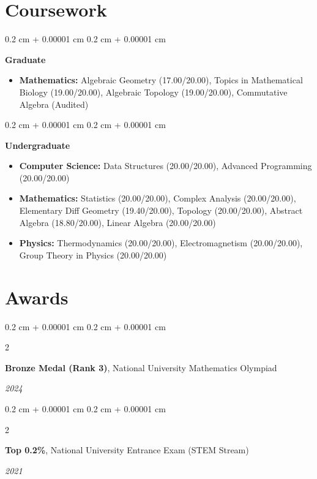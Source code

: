 \documentclass[10pt, letterpaper]{article}
\newenvironment{highlightsforbulletentries}{
    \begin{itemize}[
        topsep=0.05 cm,
        parsep=0.04 cm,
        partopsep=0pt,
        itemsep=0pt,
        leftmargin=10pt
    ]
}{
    \end{itemize}
} %
\newenvironment{onecolentry}{
    \begin{adjustwidth}{
        0.2 cm + 0.00001 cm
    }{
        0.2 cm + 0.00001 cm
    }
}{
    \end{adjustwidth}
} %
\newenvironment{twocolentry}[2][]{
    \onecolentry
    \def\secondColumn{#2}
    \setcolumnwidth{\fill, 4.5 cm}
    \begin{paracol}{2}
}{
    \switchcolumn \raggedleft \secondColumn
    \end{paracol}
    \endonecolentry
} %
\begin{document}
    \section{Coursework}        
        \begin{onecolentry}
            \textbf{Graduate}

		\begin{highlightsforbulletentries} 
        \item \textbf{Mathematics:} Algebraic Geometry (17.00/20.00), Topics in Mathematical Biology (19.00/20.00), Algebraic Topology (19.00/20.00), Commutative Algebra (Audited)
        \end{highlightsforbulletentries}  
        \end{onecolentry}    
        
        \vspace{0.2 cm}

        \begin{onecolentry}
            \textbf{Undergraduate}
		\begin{highlightsforbulletentries}
		\item \textbf{Computer Science:} Data Structures (20.00/20.00), Advanced Programming (20.00/20.00)
		 \item \textbf{Mathematics:} Statistics (20.00/20.00), Complex Analysis (20.00/20.00), Elementary Diff Geometry (19.40/20.00), Topology (20.00/20.00), Abstract Algebra (18.80/20.00), Linear Algebra (20.00/20.00)
		 \item \textbf{Physics:} Thermodynamics (20.00/20.00), Electromagnetism (20.00/20.00), Group Theory in Physics (20.00/20.00)
        \end{highlightsforbulletentries}  
        \end{onecolentry}
    
	\section{Awards}
        \begin{twocolentry}{  
            \textit{2024}}
            \textbf{Bronze Medal (Rank 3)}, National University Mathematics Olympiad
        \end{twocolentry}
        
        \vspace{0.2 cm}
        
        \begin{twocolentry}{  
            \textit{2021}}
            \textbf{Top 0.2\%}, National University Entrance Exam (STEM Stream)
        \end{twocolentry}
        
\end{document}
